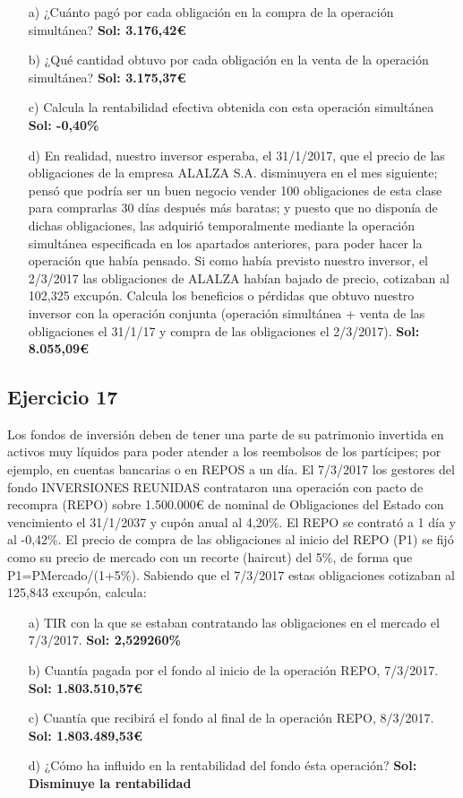 \begin{enumerate}
    \item[a)] ¿Cuánto pagó por cada obligación en la compra de la operación simultánea? \textbf{Sol: 3.176,42€}
    \item[b)] ¿Qué cantidad obtuvo por cada obligación en la venta de la operación simultánea? \textbf{Sol: 3.175,37€}
    \item[c)] Calcula la rentabilidad efectiva obtenida con esta operación simultánea \textbf{Sol: -0,40\%}
    \item[d)] En realidad, nuestro inversor esperaba, el 31/1/2017, que el precio de las obligaciones de la empresa ALALZA S.A. disminuyera en el mes siguiente; pensó que podría ser un buen negocio vender 100 obligaciones de esta clase para comprarlas 30 días después más baratas; y puesto que no disponía de dichas obligaciones, las adquirió temporalmente mediante la operación simultánea especificada en los apartados anteriores, para poder hacer la operación que había pensado. Si como había previsto nuestro inversor, el 2/3/2017 las obligaciones de ALALZA habían bajado de precio, cotizaban al 102,325 excupón. Calcula los beneficios o pérdidas que obtuvo nuestro inversor con la operación conjunta (operación simultánea + venta de las obligaciones el 31/1/17 y compra de las obligaciones el 2/3/2017). \textbf{Sol: 8.055,09€}
\end{enumerate}

\subsection*{Ejercicio 17}

Los fondos de inversión deben de tener una parte de su patrimonio invertida en activos muy líquidos para poder atender a los reembolsos de los partícipes; por ejemplo, en cuentas bancarias o en REPOS a un día. El 7/3/2017 los gestores del fondo INVERSIONES REUNIDAS contrataron una operación con pacto de recompra (REPO) sobre 1.500.000€ de nominal de Obligaciones del Estado con vencimiento el 31/1/2037 y cupón anual al 4,20\%. El REPO se contrató a 1 día y al -0,42\%. El precio de compra de las obligaciones al inicio del REPO (P1) se fijó como su precio de mercado con un recorte (haircut) del 5\%, de forma que P1=PMercado/(1+5\%). Sabiendo que el 7/3/2017 estas obligaciones cotizaban al 125,843 excupón, calcula:

\begin{enumerate}
    \item[a)] TIR con la que se estaban contratando las obligaciones en el mercado el 7/3/2017. \textbf{Sol: 2,529260\%}
    \item[b)] Cuantía pagada por el fondo al inicio de la operación REPO, 7/3/2017. \textbf{Sol: 1.803.510,57€}
    \item[c)] Cuantía que recibirá el fondo al final de la operación REPO, 8/3/2017. \textbf{Sol: 1.803.489,53€}
    \item[d)] ¿Cómo ha influido en la rentabilidad del fondo ésta operación? \textbf{Sol: Disminuye la rentabilidad}
\end{enumerate}
